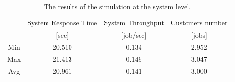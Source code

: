\begin{table}
\begin{center}
  \begin{tabular}{|c||c|c|c|}
\hline
  &System Response Time &System Throughput&Customers number \\
    &[sec]&[job/sec]&[jobs]  \\ \hline
     Min    &20.510  &0.134 & 2.952 \\ \hline
   Max &21.413 &0.149  &3.047  \\ \hline
        Avg &20.961 &0.141  &3.000  \\ \hline
      \end{tabular}\\
\end{center}
 \caption{The results of the simulation at the system level.}
 \label{fig:globres}
\end{table}

\ \\
